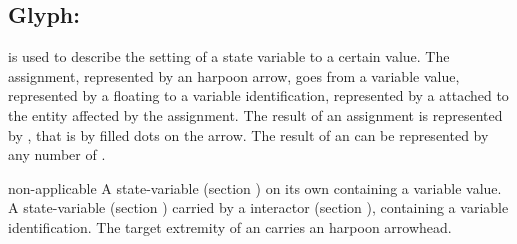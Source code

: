 
\subsection{Glyph: }\label{sec:assignment}

 is used to describe the setting of a state variable to a certain value. The assignment, represented by an harpoon arrow, goes from a variable value, represented by a floating  to a variable identification, represented by a  attached to the entity affected by the assignment.  The result of an assignment is represented by , that is by filled dots on the arrow. The result of an  can be represented by any number of .


\begin{glyphDescription}
 \glyphSboTerm non-applicable
 \glyphOrigin A state-variable (section ) on its own containing a variable value.
 \glyphTarget A state-variable (section ) carried by a interactor (section ), containing a variable identification.
 \glyphEndPoint The target extremity of an  carries an harpoon arrowhead.
 \end{glyphDescription}

